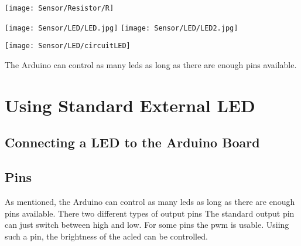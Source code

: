 \begin{center}
\texttt{[image: Sensor/Resistor/R]}
\end{center}



\begin{center}
  \texttt{[image: Sensor/LED/LED.jpg]}\quad
  \texttt{[image: Sensor/LED/LED2.jpg]}
  \label{LED:Standard}
\end{center}

\begin{center}
  \texttt{[image: Sensor/LED/circuitLED]}

\end{center}  


The Arduino can control as many \ac{led}s as long as there are enough pins available. 



\section{Using Standard External LED}


\subsection{Connecting a LED to the Arduino Board}



\subsection{Pins}

As mentioned, the Arduino can control as many \ac{led}s as long as there are enough pins available. There two different types of output pins
The standard output pin can just switch between high and low. For some pins the \ac{pwm} is usable. Usiing such a pin, the brightness of the ac{led} can be controlled.



